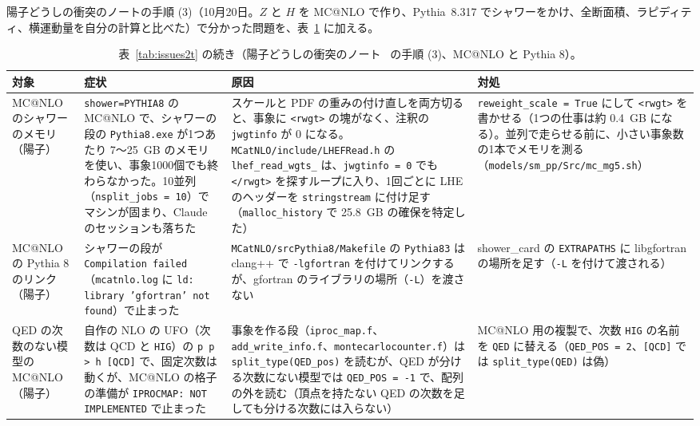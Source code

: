 \documentclass[a4paper,10pt]{ltjsarticle}
\begin{document}
陽子どうしの衝突のノートの手順 (3)（10月20日。$Z$ と $H$ を MC@NLO で作り、Pythia~8.317 でシャワーをかけ、全断面積、ラピディティ、横運動量を自分の計算と比べた）で分かった問題を、表~\ref{tab:issues2u} に加える。

\begin{table}[tbp]
\centering\footnotesize
\caption{表~\ref{tab:issues2t} の続き（陽子どうしの衝突のノート~\cite{ppnote} の手順 (3)、MC@NLO と Pythia 8）。}
\label{tab:issues2u}
\begin{tabularx}{\linewidth}{>{\raggedright\arraybackslash}p{2.4cm}>{\raggedright\arraybackslash}X>{\raggedright\arraybackslash}X>{\raggedright\arraybackslash}X}
\toprule
\textbf{対象} & \textbf{症状} & \textbf{原因} & \textbf{対処} \\
\midrule
MC@NLO のシャワーのメモリ（陽子） & \texttt{shower=PYTHIA8} の MC@NLO で、シャワーの段の \texttt{Pythia8.exe} が1つあたり 7〜25~GB のメモリを使い、事象1000個でも終わらなかった。10並列（\texttt{nsplit\_jobs = 10}）でマシンが固まり、Claude のセッションも落ちた & スケールと PDF の重みの付け直しを両方切ると、事象に \texttt{<rwgt>} の塊がなく、注釈の \texttt{jwgtinfo} が 0 になる。\nolinkurl{MCatNLO/include/LHEFRead.h} の \texttt{lhef\_read\_wgts\_} は、\texttt{jwgtinfo = 0} でも \texttt{</rwgt>} を探すループに入り、1回ごとに LHE のヘッダーを \texttt{stringstream} に付け足す（\texttt{malloc\_history} で 25.8~GB の確保を特定した） & \texttt{reweight\_scale = True} にして \texttt{<rwgt>} を書かせる（1つの仕事は約 0.4~GB になる）。並列で走らせる前に、小さい事象数の1本でメモリを測る（\nolinkurl{models/sm_pp/Src/mc_mg5.sh}） \\
MC@NLO の Pythia 8 のリンク（陽子） & シャワーの段が \texttt{Compilation failed}（\texttt{mcatnlo.log} に \texttt{ld: library 'gfortran' not found}）で止まった & \nolinkurl{MCatNLO/srcPythia8/Makefile} の \texttt{Pythia83} は clang++ で \texttt{-lgfortran} を付けてリンクするが、gfortran のライブラリの場所（\texttt{-L}）を渡さない & shower\_card の \texttt{EXTRAPATHS} に libgfortran の場所を足す（\texttt{-L} を付けて渡される） \\
QED の次数のない模型の MC@NLO（陽子） & 自作の NLO の UFO（次数は QCD と \texttt{HIG}）の \texttt{p p > h [QCD]} で、固定次数は動くが、MC@NLO の格子の準備が \texttt{IPROCMAP: NOT IMPLEMENTED} で止まった & 事象を作る段（\texttt{iproc\_map.f}、\texttt{add\_write\_info.f}、\texttt{montecarlocounter.f}）は \texttt{split\_type(QED\_pos)} を読むが、QED が分ける次数にない模型では \texttt{QED\_POS = -1} で、配列の外を読む（頂点を持たない QED の次数を足しても分ける次数には入らない） & MC@NLO 用の複製で、次数 \texttt{HIG} の名前を \texttt{QED} に替える（\texttt{QED\_POS = 2}、\texttt{[QCD]} では \texttt{split\_type(QED)} は偽） \\

\end{tabularx}
\end{table}
\end{document}
